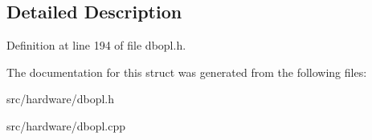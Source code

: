 \subsection{Detailed Description}


Definition at line 194 of file dbopl.\-h.



The documentation for this struct was generated from the following files\-:\begin{DoxyCompactItemize}
\item 
src/hardware/dbopl.\-h\item 
src/hardware/dbopl.\-cpp\end{DoxyCompactItemize}
